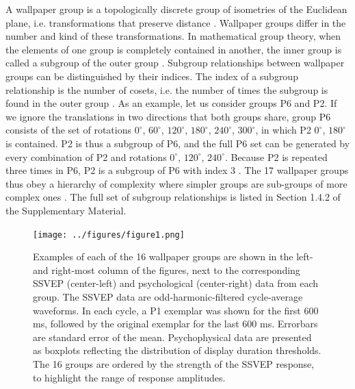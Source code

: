 \documentclass[9pt,twocolumn,twoside,lineno]{pnas-new}
\begin{document}
A wallpaper group is a topologically discrete group of isometries of the Euclidean plane, i.e. transformations that preserve distance \cite{RN1425}. Wallpaper groups differ in the number and kind of these transformations. In mathematical group theory, when the elements of one group is completely contained in another, the inner group is called a subgroup of the outer group \cite{RN1425}. Subgroup relationships between wallpaper groups can be distinguished by their indices. The index of a subgroup relationship is the number of cosets, i.e. the number of times the subgroup is found in the outer group \cite{RN1425}. As an example, let us consider groups P6 and P2. If we ignore the translations in two directions that both groups share, group P6 consists of the set of rotations {$0^{\circ}$, $60^{\circ}$, $120^{\circ}$, $180^{\circ}$, $240^{\circ}$, $300^{\circ}$}, in which P2 {$0^{\circ}$, $180^{\circ}$} is contained. P2 is thus a subgroup of P6, and the full P6 set can be generated by every combination of P2 and rotations {$0^{\circ}$, $120^{\circ}$, $240^{\circ}$}. Because P2 is repeated three times in P6, P2 is a subgroup of P6 with index 3 \cite{RN1425}. The 17 wallpaper groups thus obey a hierarchy of complexity where simpler groups are sub-groups of more complex ones \cite{RN1711}. The full set of subgroup relationships is listed in Section 1.4.2 of the Supplementary Material. 

\begin{figure}[ptb]
\centering
\texttt{[image: ../figures/figure1.png]}
\caption{Examples of each of the 16 wallpaper groups are shown in the left- and right-most column of the figures, next to the corresponding SSVEP (center-left) and psychological (center-right) data from each group. The SSVEP data are odd-harmonic-filtered cycle-average waveforms. In each cycle, a P1 exemplar was shown for the first 600 ms, followed by the original exemplar for the last 600 ms. Errorbars are standard error of the mean. Psychophysical data are presented as boxplots reflecting the distribution of display duration thresholds. The 16 groups are ordered by the strength of the SSVEP response, to highlight the range of response amplitudes.}
\label{fig:example_stimuli}
\end{figure}
\end{document}
